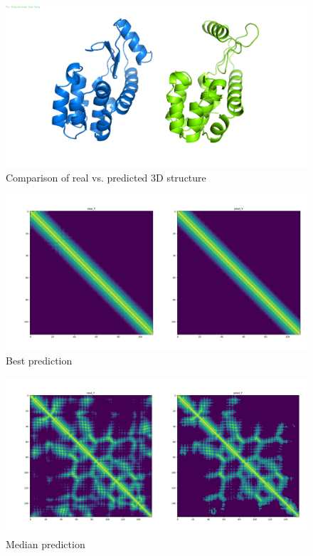 \begin{figure}
    \centering
    \includegraphics[width=\linewidth]{imgs_andy/139lA00_real_pred_3D_v2.png}
    \caption{Comparison of real vs. predicted 3D structure}
    \label{fig:real_pred}
\end{figure}

\begin{figure}
    \centering
    \includegraphics[width=\linewidth]{imgs_andy/2fxmB00_best_prediction.png}
    \caption{Best prediction}
    \label{fig:best}
\end{figure}

\begin{figure}
    \centering
    \includegraphics[width=\linewidth]{imgs_andy/1mdbA01_median_prediction.png}
    \caption{Median prediction}
    \label{fig:median}
\end{figure}

